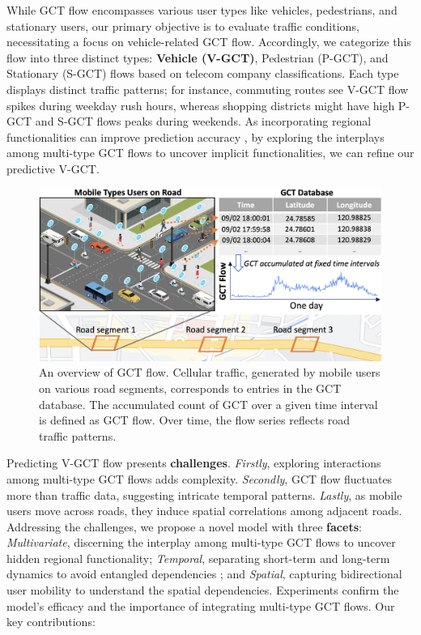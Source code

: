 \documentclass[letterpaper]{article} %
\begin{document}
While GCT flow encompasses various user types like vehicles, pedestrians, and stationary users, our primary objective is to evaluate traffic conditions, necessitating a focus on vehicle-related GCT flow. Accordingly, we categorize this flow into three distinct types: \textbf{Vehicle (V-GCT)}, Pedestrian (P-GCT), and Stationary (S-GCT) flows based on telecom company classifications. Each type displays distinct traffic patterns; for instance, commuting routes see V-GCT flow spikes during weekday rush hours, whereas shopping districts might have high P-GCT and S-GCT flows peaks during weekends. As incorporating regional functionalities can improve prediction accuracy \cite{ijcai2022p309}, by exploring the interplays among multi-type GCT flows to uncover implicit functionalities, we can refine our predictive V-GCT.
\begin{figure}[h]
\centering
\includegraphics[width=0.95\linewidth]{Figure/overview.png}
\caption{An overview of GCT flow. Cellular traffic, generated by mobile users on various road segments, corresponds to entries in the GCT database. The accumulated count of GCT over a given time interval is defined as GCT flow. Over time, the flow series reflects road traffic patterns.}
\label{fig:overview}
\end{figure}

Predicting V-GCT flow presents \textbf{challenges}. \textit{Firstly}, exploring interactions among multi-type GCT flows adds complexity. \textit{Secondly}, GCT flow fluctuates more than traffic data, suggesting intricate temporal patterns. \textit{Lastly}, as mobile users move across roads, they induce spatial correlations among adjacent roads. Addressing the challenges, we propose a novel model with three \textbf{facets}: \textit{Multivariate}, discerning the interplay among multi-type GCT flows to uncover hidden regional functionality; \textit{Temporal}, separating short-term and long-term dynamics to avoid entangled dependencies \cite{ye2022learning}; and \textit{Spatial}, capturing bidirectional user mobility to understand the spatial dependencies. Experiments confirm the model's efficacy and the importance of integrating multi-type GCT flows. Our key contributions:
\end{document}
